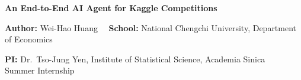 \documentclass{article}
\newcommand{\titlesize}{\fontsize{80}{90}\selectfont}
\newcommand{\metasize}{\fontsize{26}{36}\selectfont}
\newcommand{\bodysize}{\fontsize{26.5}{37.5}\selectfont}
\newlength{\pagepad}\setlength{\pagepad}{10mm}
\newcommand{\sep}{\ \textperiodcentered\ }
\begin{document}
%
\bodysize\color{bodyink}%

\begin{tcolorbox}[enhanced, width=\paperwidth, sharp corners,
    colback=navy, boxrule=0pt, frame hidden,
    left=\pagepad, right=\pagepad, top=17mm, bottom=15mm, boxsep=0pt,
    before skip=0pt, after skip=0pt]
  {\titlesize\bfseries\color{white}%
    An End-to-End AI Agent for Kaggle Competitions\par}
  \vspace{5.3mm}
  {\metasize\color{white}%
    {\bfseries Author:} Wei-Hao Huang\sep
    {\bfseries School:} National Chengchi University,
    Department of Economics\par}
  \vspace{2.5mm}
  {\metasize\color{white}%
    {\bfseries PI:} Dr.\ Tso-Jung Yen,
    Institute of Statistical Science, Academia Sinica\sep
    Summer Internship\par}
\end{tcolorbox}

\vspace{18.05mm}
\end{document}
